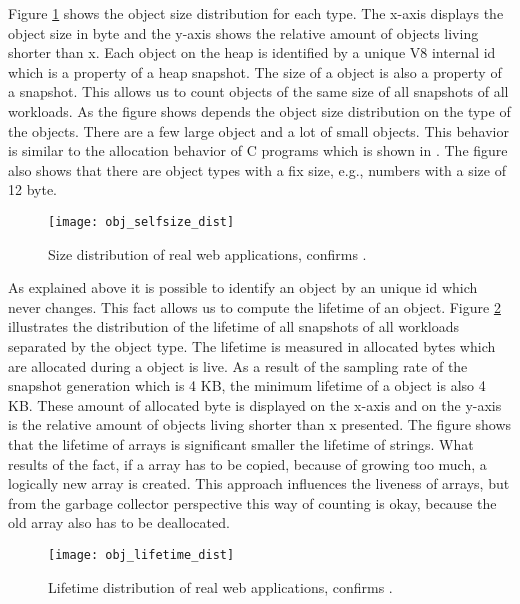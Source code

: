 Figure \ref{fig:obj_selfsize_dist} shows the object size distribution for each type. The x-axis displays the object size in byte and the y-axis shows the relative amount of objects living shorter than x. Each object on the \JS heap is identified by a unique V8 internal id which is a property of a heap snapshot. The size of a object is also a property of a snapshot. This allows us to count objects of the same size of all snapshots of all workloads. As the figure shows depends the object size distribution on the type of the objects. There are a few large object and a lot of small objects. This behavior is similar to the allocation behavior of C programs which is shown in \cite{Aigner2013}. The figure also shows that there are object types with a fix size, e.g., numbers with a size of 12 byte.
\begin{figure}
	\centering
	\texttt{[image: obj\_selfsize\_dist]}
	\caption{Size distribution of real web applications, confirms \cite{JSMeter2009}.}
	\label{fig:obj_selfsize_dist}
\end{figure}

As explained above it is possible to identify an object by an unique id which never changes. This fact allows us to compute the lifetime of an object. Figure \ref{fig:obj_lifetime_dist} illustrates the distribution of the lifetime of all snapshots of all workloads separated by the object type. The lifetime is measured in allocated bytes which are allocated during a object is live. As a result of the sampling rate of the snapshot generation which is 4 KB, the minimum lifetime of a object is also 4 KB. These amount of allocated byte is displayed on the x-axis and on the y-axis is the relative amount of objects living shorter than x presented. The figure shows that the lifetime of arrays is significant smaller the lifetime of strings. What results of the fact, if a array has to be copied, because of growing too much, a logically new array is created. This approach influences the liveness of arrays, but from the garbage collector perspective this way of counting is okay, because the old array also has to be deallocated.
\begin{figure}
	\centering
	\texttt{[image: obj\_lifetime\_dist]}
	\caption{Lifetime distribution of real web applications, confirms \cite{JSMeter2009}.}
	\label{fig:obj_lifetime_dist}
\end{figure}

